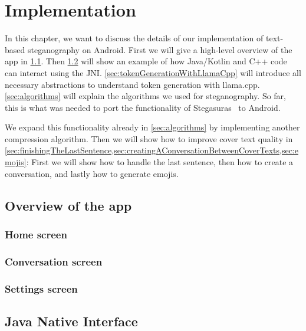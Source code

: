 
\chapter{Implementation}\label{ch:implementation}
\glsresetall %

In this chapter, we want to discuss the details of our implementation of text-based steganography on Android. First we will give a high-level overview of the app in \cref{sec:overviewOfTheApp}. Then \cref{sec:jni} will show an example of how Java/Kotlin and C++ code can interact using the \gls{JNI}. \cref{sec:tokenGenerationWithLlamaCpp} will introduce all necessary abstractions to understand token generation with llama.cpp. \cref{sec:algorithms} will explain the algorithms we used for steganography. So far, this is what was needed to port the functionality of Stegasuras~\cite{zieglerNeuralLinguisticSteganography2019} to Android.

We expand this functionality already in \cref{sec:algorithms} by implementing another compression algorithm. Then we will show how to improve cover text quality in \cref{sec:finishingTheLastSentence,sec:creatingAConversationBetweenCoverTexts,sec:emojis}: First we will show how to handle the last sentence, then how to create a conversation, and lastly how to generate emojis.

\section{Overview of the app}
\label{sec:overviewOfTheApp}

\subsection{Home screen}
\label{sec:homeScreen}

\subsection{Conversation screen}
\label{sec:conversationScreen}

\subsection{Settings screen}
\label{sec:settingsScreen}

\section{Java Native Interface}
\label{sec:jni}


